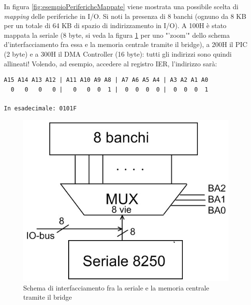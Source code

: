 In figura \ref{fig:esempioPerifericheMappate} viene mostrata una possibile scelta di \textit{mapping} delle periferiche in I/O. Si noti la presenza di 8 banchi (ognuno da 8 KB per un totale di 64 KB di spazio di indirizzamento in I/O). A 100H è stato mappata la seriale (8 byte, si veda la figura \ref{fig:mux8vie} per uno "'zoom'" dello schema d'interfacciamento fra essa e la memoria centrale tramite il bridge), a 200H il PIC (2 byte) e a 300H il DMA Controller (16 byte): tutti gli indirizzi sono quindi allineati!
Volendo, ad esempio, accedere al registro IER, l'indirizzo sarà:
\begin{verbatim}
A15 A14 A13 A12 | A11 A10 A9 A8 | A7 A6 A5 A4 | A3 A2 A1 A0
  0   0   0   0 |   0   0  0  1 |  0  0  0  0 |  0  0  0  1

In esadecimale: 0101F
\end{verbatim}

\begin{figure}[!h]
\centering
\includegraphics[width=0.75\columnwidth]{img/mux8vie}
\caption{Schema di interfacciamento fra la seriale e la memoria centrale tramite il bridge}
\label{fig:mux8vie}
\end{figure}
